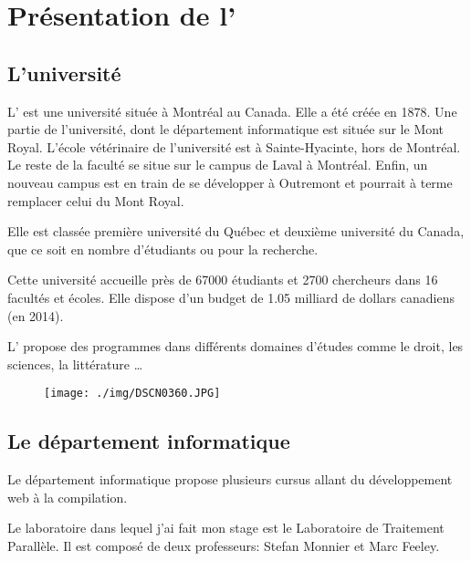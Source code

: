 \chapter{Présentation de l'\udem{}}

    \section{L'université}

        L'\udem{} est une université située à Montréal au Canada.
        Elle a été créée en 1878.
        Une partie de l'université, dont le département informatique est située sur le Mont Royal.
        L'école vétérinaire de l'université est à Sainte-Hyacinte, hors de Montréal.
        Le reste de la faculté se situe sur le campus de Laval à Montréal.
        Enfin, un nouveau campus est en train de se développer à Outremont et pourrait à terme remplacer celui du Mont Royal.

        Elle est classée première université du Québec\cite{udemnum} et deuxième université du Canada\cite{udemnum}, que ce soit en nombre
        d'étudiants ou pour la recherche.

        Cette université accueille près de \num{67 000} étudiants et \num{2 700} chercheurs dans 16 facultés et écoles\cite{udemnum}.
        Elle dispose d'un budget de \num{1,05} milliard de dollars canadiens\cite{wikinum} (en 2014).

        L'\udem{} propose des programmes dans différents domaines d'études comme le droit, les sciences, la littérature \dots
        \begin{figure}[!h]
            \centering
            \texttt{[image: ./img/DSCN0360.JPG]}
            \caption{\udem{}}
\label{fig:udem}
        \end{figure}
        \clearpage

        \section{Le département informatique}

        Le département informatique propose plusieurs cursus allant du développement web à la compilation.

        Le laboratoire dans lequel j'ai fait mon stage est le Laboratoire de Traitement Parallèle.
        Il est composé de deux professeurs: Stefan Monnier et Marc Feeley.


